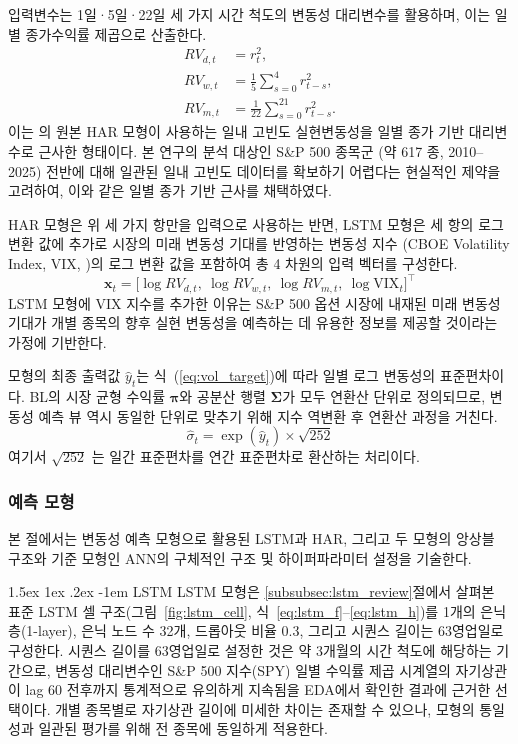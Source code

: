 \documentclass[eng]{kjas3}
\makeatletter
\newcommand\paragraph{\@startsection{paragraph}{4}{\z@}%
    {1.5ex \@plus1ex \@minus.2ex}%
    {-1em}%
    {\normalfont\normalsize\bfseries}}
\makeatother
\begin{document}
입력변수는 1일·5일·22일 세 가지 시간 척도의 변동성 대리변수를 활용하며, 이는 일별 종가수익률 제곱으로 산출한다.
\begin{align}
RV_{d,t} &= r_t^2,\\
RV_{w,t} &= \frac{1}{5}\sum_{s=0}^{4} r_{t-s}^2,\\
RV_{m,t} &= \frac{1}{22}\sum_{s=0}^{21} r_{t-s}^2.
\end{align}
이는 \citet{corsi2009}의 원본 HAR 모형이 사용하는 일내 고빈도 실현변동성을 일별 종가 기반 대리변수로 근사한 형태이다. 본 연구의 분석 대상인 S\&P 500 종목군 (약 617 종, 2010--2025) 전반에 대해 일관된 일내 고빈도 데이터를 확보하기 어렵다는 현실적인 제약을 고려하여, 이와 같은 일별 종가 기반 근사를 채택하였다.

HAR 모형은 위 세 가지 항만을 입력으로 사용하는 반면, LSTM 모형은 세 항의 로그 변환 값에 추가로 시장의 미래 변동성 기대를 반영하는 변동성 지수 (CBOE Volatility Index, VIX, \citealp{whaley2009understanding})의 로그 변환 값을 포함하여 총 4 차원의 입력 벡터를 구성한다.
\begin{equation}
\mathbf{x}_t = \bigl[\log RV_{d,t},\ \log RV_{w,t},\ \log RV_{m,t},\
\log \text{VIX}_t\bigr]^\top
\label{eq:vol_input}
\end{equation}
LSTM 모형에 VIX 지수를 추가한 이유는 S\&P 500 옵션 시장에 내재된 미래 변동성 기대가 개별 종목의 향후 실현 변동성을 예측하는 데 유용한 정보를 제공할 것이라는 가정에 기반한다.

모형의 최종 출력값 $\hat{y}_t$는 식~(\ref{eq:vol_target})에 따라 일별 로그 변동성의 표준편차이다. BL의 시장 균형 수익률 $\boldsymbol{\pi}$와 공분산 행렬 $\boldsymbol{\Sigma}$가 모두 연환산 단위로 정의되므로, 변동성 예측 뷰 역시 동일한 단위로 맞추기 위해 지수 역변환 후 연환산 과정을 거친다.
\begin{equation}
\hat{\sigma}_t = \exp(\hat{y}_t) \times \sqrt{252}
\label{eq:bl_input}
\end{equation}
여기서 $\sqrt{252}$ 는 일간 표준편차를 연간 표준편차로 환산하는 처리이다.

\subsubsection{예측 모형}

본 절에서는 변동성 예측 모형으로 활용된 LSTM과 HAR, 그리고 두 모형의 앙상블 구조와 기준 모형인 ANN의 구체적인 구조 및 하이퍼파라미터 설정을 기술한다.

\paragraph{LSTM}
LSTM 모형은 \ref{subsubsec:lstm_review}절에서 살펴본 표준 LSTM 셀 구조(그림~\ref{fig:lstm_cell}, 식~\ref{eq:lstm_f}--\ref{eq:lstm_h})를 1개의 은닉층(1-layer), 은닉 노드 수 32개, 드롭아웃 비율 0.3, 그리고 시퀀스 길이는 63영업일로 구성한다. 시퀀스 길이를 63영업일로 설정한 것은 약 3개월의 시간 척도에 해당하는 기간으로, 변동성 대리변수인 S\&P 500 지수(SPY) 일별 수익률 제곱 시계열의 자기상관이 lag 60 전후까지 통계적으로 유의하게 지속됨을 EDA에서 확인한 결과에 근거한 선택이다. 개별 종목별로 자기상관 길이에 미세한 차이는 존재할 수 있으나, 모형의 통일성과 일관된 평가를 위해 전 종목에 동일하게 적용한다.
\end{document}
